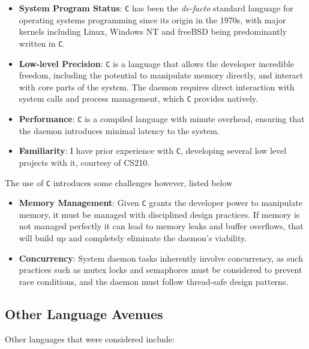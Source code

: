 \documentclass[11pt,titlepage,dvipsnames,table,xcdraw]{article}
\begin{document}
\begin{itemize}
  \item \textbf{System Program Status}: \verb_C_ has been the \textit{de-facto} standard language for operating systems programming since its origin in the 1970s, with major kernels including Linux, Windows NT and freeBSD
    being predominantly written in \verb_C_.

  \item \textbf{Low-level Precision}: \verb_C_ is a language that allows the developer incredible freedom, including the potential to manipulate memory directly, and interact with core parts of the system. The daemon requires
    direct interaction with system calls and process management, which \verb_C_ provides natively.

  \item \textbf{Performance}: \verb_C_ is a compiled language with minute overhead, ensuring that the daemon introduces minimal latency to the system.

  \item \textbf{Familiarity}: I have prior experience with \verb_C_, developing several low level projects with it, courtesy of CS210.
\end{itemize}

The use of \verb_C_ introduces some challenges however, listed below

\begin{itemize}
  \item \textbf{Memory Management}: Given \verb_C_ grants the developer power to manipulate memory, it must be managed with disciplined design practices. If memory is not managed perfectly it can lead to
    memory leaks and buffer overflows, that will build up and completely eliminate the daemon's viability.

  \item \textbf{Concurrency}: System daemon tasks inherently involve concurrency, as such practices such as mutex locks and semaphores must be considered to prevent race conditions, and the daemon must follow
    thread-safe design patterns.
\end{itemize}

\subsection{Other Language Avenues}

Other languages that were considered include:
\end{document}
